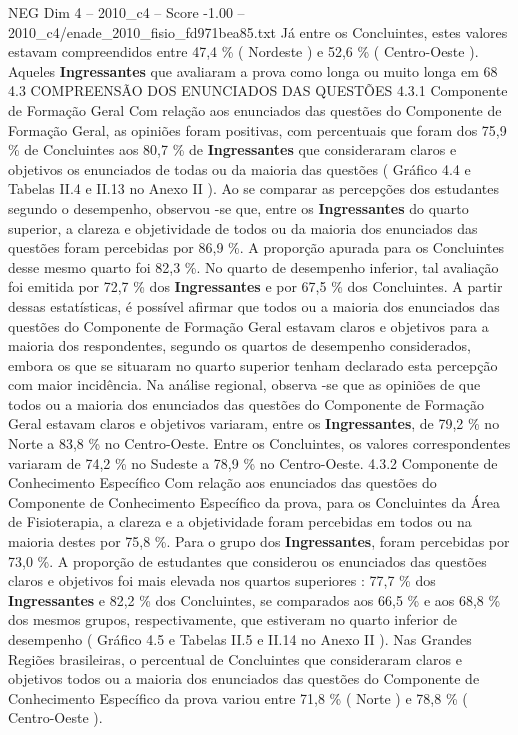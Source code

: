 \begin{textsample}{NEG Dim 4 – 2010\_c4 – Score -1.00 – 2010\_c4/enade\_2010\_fisio\_fd971bea85.txt}
Já entre os Concluintes, estes valores estavam compreendidos entre 47,4 \% ( Nordeste ) e 52,6 \% ( Centro-Oeste ).
Aqueles \textbf{Ingressantes} que avaliaram a prova como longa ou muito longa em 68 4.3 COMPREENSÃO DOS ENUNCIADOS DAS QUESTÕES 4.3.1 Componente de Formação Geral Com relação aos enunciados das questões do Componente de Formação Geral, as opiniões foram positivas, com percentuais que foram dos 75,9 \% de Concluintes aos 80,7 \% de \textbf{Ingressantes} que consideraram claros e objetivos os enunciados de todas ou da maioria das questões ( Gráfico 4.4 e Tabelas II.4 e II.13 no Anexo II ).
Ao se comparar as percepções dos estudantes segundo o desempenho, observou -se que, entre os \textbf{Ingressantes} do quarto superior, a clareza e objetividade de todos ou da maioria dos enunciados das questões foram percebidas por 86,9 \%.
A proporção apurada para os Concluintes desse mesmo quarto foi 82,3 \%.
No quarto de desempenho inferior, tal avaliação foi emitida por 72,7 \% dos \textbf{Ingressantes} e por 67,5 \% dos Concluintes.
A partir dessas estatísticas, é possível afirmar que todos ou a maioria dos enunciados das questões do Componente de Formação Geral estavam claros e objetivos para a maioria dos respondentes, segundo os quartos de desempenho considerados, embora os que se situaram no quarto superior tenham declarado esta percepção com maior incidência.
Na análise regional, observa -se que as opiniões de que todos ou a maioria dos enunciados das questões do Componente de Formação Geral estavam claros e objetivos variaram, entre os \textbf{Ingressantes}, de 79,2 \% no Norte a 83,8 \% no Centro-Oeste.
Entre os Concluintes, os valores correspondentes variaram de 74,2 \% no Sudeste a 78,9 \% no Centro-Oeste. 4.3.2 Componente de Conhecimento Específico Com relação aos enunciados das questões do Componente de Conhecimento Específico da prova, para os Concluintes da Área de Fisioterapia, a clareza e a objetividade foram percebidas em todos ou na maioria destes por 75,8 \%.
Para o grupo dos \textbf{Ingressantes}, foram percebidas por 73,0 \%.
A proporção de estudantes que considerou os enunciados das questões claros e objetivos foi mais elevada nos quartos superiores : 77,7 \% dos \textbf{Ingressantes} e 82,2 \% dos Concluintes, se comparados aos 66,5 \% e aos 68,8 \% dos mesmos grupos, respectivamente, que estiveram no quarto inferior de desempenho ( Gráfico 4.5 e Tabelas II.5 e II.14 no Anexo II ).
Nas Grandes Regiões brasileiras, o percentual de Concluintes que consideraram claros e objetivos todos ou a maioria dos enunciados das questões do Componente de Conhecimento Específico da prova variou entre 71,8 \% ( Norte ) e 78,8 \% ( Centro-Oeste ).

\end{textsample}
